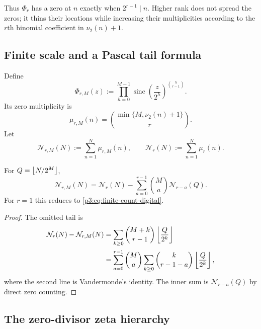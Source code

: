 \documentclass[11pt,oneside]{article}
\theoremstyle{definition}
\theoremstyle{remark}
\newcommand{\sinc}{\operatorname{sinc}}
\begin{document}
Thus $\Phi_r$ has a zero at $n$ exactly when $2^{r-1}\mid n$.  Higher rank does not spread the zeros; it thins their locations while increasing their multiplicities according to the $r$th binomial coefficient in $\nu_2(n)+1$.

\subsection{Finite scale and a Pascal tail formula}

Define
\begin{equation}\label{p3:eq:finite-phir}
  \Phi_{r,M}(z):=\prod_{h=0}^{M-1}
  \sinc\!\left(\frac z{2^h}\right)^{\binom h{r-1}}.
\end{equation}
Its zero multiplicity is
\begin{equation}\label{p3:eq:finite-mu-r}
  \mu_{r,M}(n)=\binom{\min\{M,\nu_2(n)+1\}}{r}.
\end{equation}
Let
\[
 \mathcal N_{r,M}(N):=\sum_{n=1}^{N}\mu_{r,M}(n),
 \qquad
 \mathcal N_r(N):=\sum_{n=1}^{N}\mu_r(n).
\]

\begin{proposition}\label{p3:prop:finite-tail-r}
For $Q=\left\lfloor N/2^M\right\rfloor$,
\begin{equation}\label{p3:eq:finite-tail-r}
 \mathcal N_{r,M}(N)
 =\mathcal N_r(N)-\sum_{a=0}^{r-1}\binom Ma\mathcal N_{r-a}(Q).
\end{equation}
For $r=1$ this reduces to \eqref{p3:eq:finite-count-digital}.
\end{proposition}

\begin{proof}
The omitted tail is
\begin{align*}
 \mathcal N_r(N)-\mathcal N_{r,M}(N)
 &=\sum_{k\ge0}\binom{M+k}{r-1}\left\lfloor \frac Q{2^k}\right\rfloor\\
 &=\sum_{a=0}^{r-1}\binom Ma
   \sum_{k\ge0}\binom{k}{r-1-a}\left\lfloor \frac Q{2^k}\right\rfloor,
\end{align*}
where the second line is Vandermonde's identity.  The inner sum is $\mathcal N_{r-a}(Q)$ by direct zero counting.
\end{proof}

\subsection{The zero-divisor zeta hierarchy}
\end{document}

